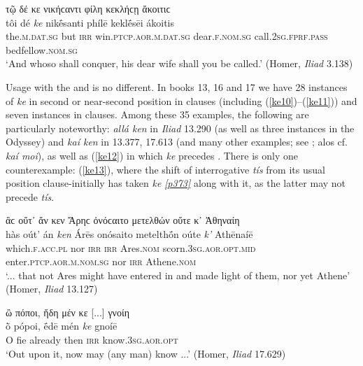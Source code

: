 \begin{exe}
\ex τῷ δέ κε νικήϲαντι φίλη κεκλήϲῃ ἄκοιτιϲ\\
\gll tôi dé \emph{ke} nikḗsanti phílē keklḗsēi ákoitis\\
the.\textsc{m.dat.sg} but \textsc{irr} win.\textsc{ptcp.aor.m.dat.sg}
dear.\textsc{f.nom.sg} call.\textsc{2sg.fprf.pass} bedfellow.\textsc{nom.sg}\\
\trans `And whoso shall conquer, his dear wife shall you be called.' (Homer, \textit{Iliad} 3.138)
\label{ke9}
\end{exe}

Usage with the  and  is no different. In books 13, 16 and 17 we have 28 instances of \textit{ke} in second or near-second position in  clauses (including (\ref{ke10})--(\ref{ke11})) and seven instances in  clauses. Among these 35 examples, the following are particularly noteworthy: \textit{allá ken} in \textit{Iliad} 13.290 (as well as three instances in the Odyssey) and \textit{kaí ken} in 13.377,
17.613 (and many other examples; see \citet[733]{Eberhard1885}; alos cf. \textit{kaí moi}), as well as (\ref{ke12}) in which \textit{ke} precedes . There is only one counterexample: (\ref{ke13}), where the shift of interrogative \textit{tís} from its usual position clause-initially has taken \textit{ke} \hyperlink{p373}{\emph{[p373]}} along with it, as the latter may not precede \textit{tís}.

\begin{exe}
\ex ἃϲ οὔτ᾽ ἄν κεν Ἄρηϲ ὀνόϲαιτο μετελθών οὔτε κ᾽ Ἀθηναίη\\
\gll hàs oút' án \emph{ken} Árēs onósaito metelthṓn oúte \emph{k'} Athēnaíē\\
which.\textsc{f.acc.pl} nor \textsc{irr} \textsc{irr} Ares.\textsc{nom}
scorn.\textsc{3sg.aor.opt.mid} enter.\textsc{ptcp.aor.m.nom.sg} nor \textsc{irr} Athene.\textsc{nom}\\
\trans `... that not Ares might have entered in and made light of them, nor yet Athene' (Homer, \textit{Iliad} 13.127)
\label{ke10}
\end{exe}

\begin{exe}
\ex ὢ πόποι, ἤδη μέν κε {[}...{]} γνοίη\\
\gll ṑ pópoi, ḗdē mén \emph{ke} gnoíē\\
O fie already then \textsc{irr} know.\textsc{3sg.aor.opt}\\
\trans `Out upon it, now may (any man) know ...' (Homer, \textit{Iliad} 17.629)
\label{ke11}
\end{exe}

